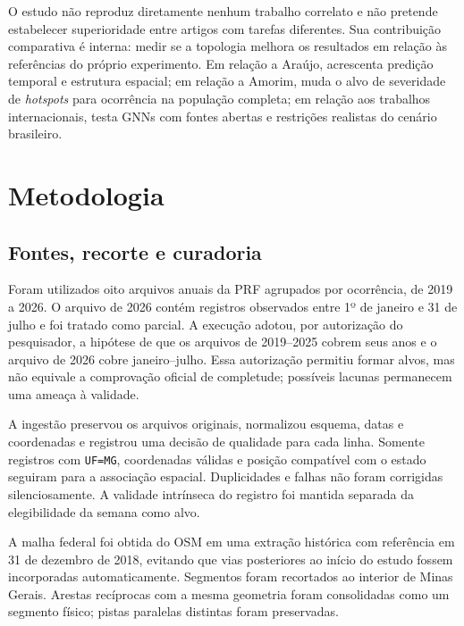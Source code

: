 \documentclass[12pt]{article}
\begin{document}
O estudo não reproduz diretamente nenhum trabalho correlato e não
pretende estabelecer superioridade entre artigos com tarefas
diferentes. Sua contribuição comparativa é interna: medir se a
topologia melhora os resultados em relação às referências do próprio
experimento. Em relação a Araújo, acrescenta predição temporal e
estrutura espacial; em relação a Amorim, muda o alvo de severidade de
\textit{hotspots} para ocorrência na população completa; em relação
aos trabalhos internacionais, testa GNNs com fontes abertas e
restrições realistas do cenário brasileiro.

\section{Metodologia}
\label{sec:metodologia}

\subsection{Fontes, recorte e curadoria}

Foram utilizados oito arquivos anuais da PRF agrupados por ocorrência,
de 2019 a 2026. O arquivo de 2026 contém registros observados entre 1º
de janeiro e 31 de julho e foi tratado como parcial. A execução adotou,
por autorização do pesquisador, a hipótese de que os arquivos de
2019--2025 cobrem seus anos e o arquivo de 2026 cobre janeiro--julho.
Essa autorização permitiu formar alvos, mas não equivale a comprovação
oficial de completude; possíveis lacunas permanecem uma ameaça à
validade.

A ingestão preservou os arquivos originais, normalizou esquema, datas e
coordenadas e registrou uma decisão de qualidade para cada linha.
Somente registros com \texttt{UF=MG}, coordenadas válidas e posição
compatível com o estado seguiram para a associação espacial.
Duplicidades e falhas não foram corrigidas silenciosamente. A
validade intrínseca do registro foi mantida separada da elegibilidade
da semana como alvo.

A malha federal foi obtida do OSM em uma extração histórica com
referência em 31 de dezembro de 2018, evitando que vias posteriores ao
início do estudo fossem incorporadas automaticamente. Segmentos foram
recortados ao interior de Minas Gerais. Arestas recíprocas com a mesma
geometria foram consolidadas como um segmento físico; pistas paralelas
distintas foram preservadas.
\end{document}
